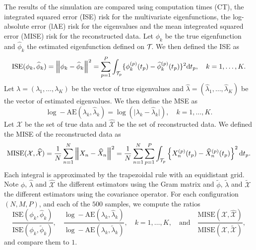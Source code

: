 The results of the simulation are compared using computation times (CT), the integrated squared error (ISE) risk for the multivariate eigenfunctions, the log-absolute error (lAE) risk for the eigenvalues and the mean integreated squared error (MISE) risk for the reconstructed data. Let $\phi_k$ be the true eigenfunction and $\widehat{\phi}_k$ the estimated eigenfunction defined on $\mathcal{T}_{}$. We then defined the ISE as 
\begin{equation}\label{eq:ise_eigenfunctions}
    \text{ISE}(\phi_k, \widehat{\phi}_k) = \left|\!\left|\!\left|\phi_k - \widehat{\phi}_k\right|\!\right|\!\right|^2 = \sum_{p = 1}^P \int_{\mathcal{T}_{p}} \{\phi^{(p)}_k(t_p) - \widehat{\phi}^{(p)}_k(t_p)\}^2 {\rm d} t_p, \quad k = 1, \dots, K.
\end{equation}
Let $\lambda = (\lambda_1, \dots, \lambda_K)$ be the vector of true eigenvalues and $\widehat{\lambda} = (\widehat{\lambda}_1, \dots, \widehat{\lambda}_K)$ be the vector of estimated eigenvalues. We then define the MSE as 
\begin{equation}\label{eq:mse_eigenvalues}
    \log-\text{AE}(\lambda_k, \widehat{\lambda}_k) = \log(\lvert \lambda_k - \widehat{\lambda}_k\rvert), \quad k = 1, \dots, K.
\end{equation}
Let $\mathcal{X}$ be the set of true data and $\widehat{\mathcal{X}}$ be the set of reconstructed data. We defined the MISE of the reconstructed data as
\begin{equation}\label{eq:mise_reconstructed_data}
    \text{MISE}(\mathcal{X}, \widehat{\mathcal{X}}) = \frac{1}{N}\sum_{n = 1}^N \left|\!\left|\!\left|X_n - \widehat{X}_n\right|\!\right|\!\right|^2 = \frac{1}{N}\sum_{n = 1}^N \sum_{p = 1}^P \int_{\mathcal{T}_{p}} \left\{X_n^{(p)}(t_p) - \widehat{X}_n^{(p)}(t_p) \right\}^2 {\rm d} t_p.
\end{equation}
Each integral is approximated by the trapezoidal rule with an equidistant grid. Note $\widehat{\phi}$, $\widehat{\lambda}$ and $\widehat{\mathcal{X}}$ the different estimators using the Gram matrix and $\widetilde{\phi}$, $\widetilde{\lambda}$ and $\widetilde{\mathcal{X}}$ the different estimators using the covariance operator. For each configuration $(N, M, P)$, and each of the $500$ samples, we compute the ratios
\begin{equation}
    \frac{\text{ISE}(\phi_k, \widehat{\phi}_k)}{\text{ISE}(\phi_k, \widetilde{\phi}_k)}, \quad \frac{\log -\text{AE}(\lambda_k, \widehat{\lambda}_k)}{\log-\text{AE}(\lambda_k, \widetilde{\lambda}_k)},\quad k = 1, \dots, K, \quad\text{and}\quad \frac{\text{MISE}(\mathcal{X}, \widehat{\mathcal{X}})}{\text{MISE}(\mathcal{X}, \widetilde{\mathcal{X}})},
\end{equation}
and compare them to $1$.

